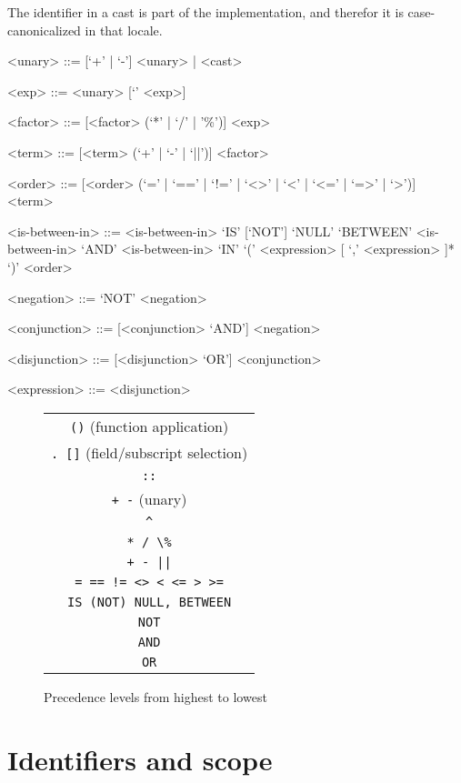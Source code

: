 \documentclass{article}
\begin{document}
The identifier in a cast is part of the \SoQL{} implementation, and
therefor it is case-canonicalized in that locale.

\begin{grammar}
<unary> ::= [`+' | `-'] <unary> | <cast>

<exp> ::= <unary> [`\caret' <exp>]

<factor> ::= [<factor> (`*' | `/' | '\%')] <exp>

<term> ::= [<term> (`+' | `-' | `||')] <factor>

<order> ::= [<order> (`=' | `==' | `!=' | `<>' | `<' | `<=' | `=>' | `>')] <term>

<is-between-in> ::= <is-between-in> `IS' [`NOT'] `NULL'
  `BETWEEN' <is-between-in> `AND' <is-between-in>
  `IN' `(' <expression>  [ `,' <expression> ]* `)'
 \alt <order>

<negation> ::= `NOT' <negation>

<conjunction> ::= [<conjunction> `AND'] <negation>

<disjunction> ::= [<disjunction> `OR'] <conjunction>

<expression> ::= <disjunction>
\end{grammar}

\begin{figure}
\begin{center}
\begin{tabular}{c}
\lstinline|()| (function application) \\
\lstinline|. []| (field/subscript selection) \\
\lstinline|::| \\
\lstinline|+ -| (unary) \\
\lstinline|^| \\
\lstinline|* / \%| \\
\lstinline!+ - ||! \\
\lstinline|= == != <> < <= > >=| \\
\lstinline|IS (NOT) NULL, BETWEEN| \\
\lstinline|NOT| \\
\lstinline|AND| \\
\lstinline|OR| \\
\end{tabular}
\end{center}
\caption{Precedence levels from highest to lowest}
\label{precedence}
\end{figure}

\section{Identifiers and scope}
\end{document}
